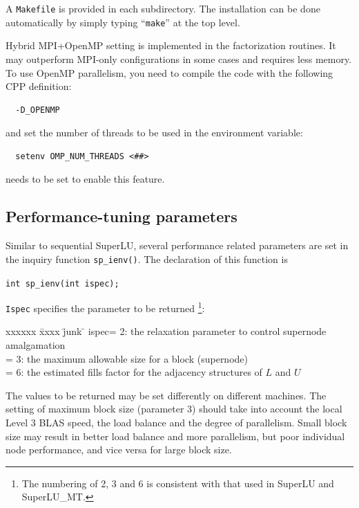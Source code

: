 A {\tt Makefile} is provided in each subdirectory. The installation can be
done automatically by simply typing ``{\tt make}'' at the top level.

Hybrid MPI+OpenMP setting is implemented in the factorization routines.
It may outperform MPI-only configurations in some cases and
requires less memory. 	To use OpenMP parallelism, you need to compile
the code with the following CPP definition:

\begin{verbatim}
  -D_OPENMP
\end{verbatim}
and set the number of threads to be used in the environment variable:
\begin{verbatim}
  setenv OMP_NUM_THREADS <##>
\end{verbatim}

\noindent needs to be set to enable this feature.

\subsection{Performance-tuning parameters}
\label{sec:SuperLU_DIST_sp_ienv}

Similar to sequential SuperLU, several performance related parameters
are set in the inquiry function {\tt sp\_ienv()}.
The declaration of this function is

\vspace{.1in}
{\tt int sp\_ienv(int ispec);}
\vspace{.1in}

{\tt Ispec} specifies the parameter to be returned%
\footnote{The numbering of 2, 3 and 6 is consistent with that used
in SuperLU and SuperLU\_MT.}:
\begin{tabbing}
xxxxxx \= xxxx \= junk \= \kill
\>ispec\>= 2: the relaxation parameter to control supernode amalgamation\\
\>     \>= 3: the maximum allowable size for a block (supernode) \\
\>     \>= 6: the estimated fills factor for the adjacency structures 
	      of $L$ and $U$
\end{tabbing}	    

The values to be returned may be set differently on different machines.
The setting of maximum block size (parameter 3) should take into
account the local Level 3 BLAS speed, the load balance and the 
degree of parallelism. Small block size may result in better
load balance and more parallelism, but poor individual node performance,
and vice versa for large block size. 

